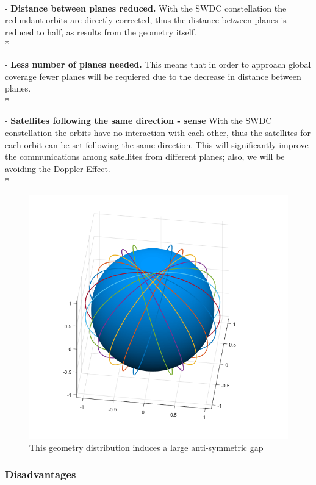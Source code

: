 \paragraph{   }


-	\textbf{Distance between planes reduced.} With the SWDC constellation the redundant orbits are directly corrected, thus the distance between planes is reduced to half, as results from the geometry itself. \\*

-	\textbf{Less number of planes needed.} This means that in order to approach global coverage fewer planes will be requiered due to the decrease in distance between planes.\\*
 
-	\textbf{Satellites following the same direction - sense} With the SWDC constellation the orbits have no interaction with each other, thus the satellites for each orbit can be set following the same direction. This will significantly improve the communications among satellites from different planes; also, we will be avoiding the Doppler Effect.\\*

\begin{figure}[h]
\includegraphics[width=12cm]{semiwalker12}
\centering
\caption{This geometry distribution induces a large anti-symmetric gap}
\end{figure}

\subsubsection{Disadvantages}
